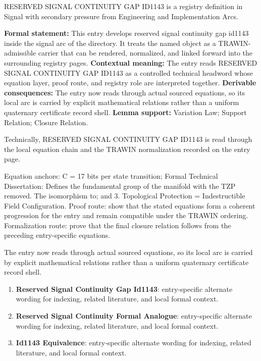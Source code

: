 
\begingroup\small
{}
RESERVED SIGNAL CONTINUITY GAP ID1143 is a registry definition in Signal with secondary pressure from Engineering and Implementation Arcs.

\begingroup\footnotesize\setlength{\emergencystretch}{3em}\sloppy
\textbf{Formal statement:} This entry develops reserved signal continuity gap id1143 inside the signal arc of the directory. It treats the named object as a TRAWIN-admissible carrier that can be rendered, normalized, and linked forward into the surrounding registry pages. \textbf{Contextual meaning:} The entry reads RESERVED SIGNAL CONTINUITY GAP ID1143 as a controlled technical headword whose equation layer, proof route, and registry role are interpreted together. \textbf{Derivable consequences:} The entry now reads through actual sourced equations, so its local arc is carried by explicit mathematical relations rather than a uniform quaternary certificate record shell. \textbf{Lemma support:} Variation Law; Support Relation; Closure Relation.\par
\endgroup

Technically, RESERVED SIGNAL CONTINUITY GAP ID1143 is read through the local equation chain and the TRAWIN normalization recorded on the entry page.

Equation anchors: C = 17 bits per state transition; Formal Technical Dissertation: Defines the fundamental group of the manifold with the TZP removed. The isomorphism to; and 3. Topological Protection = Indestructible Field Configuration. Proof route: show that the stated equations form a coherent progression for the entry and remain compatible under the TRAWIN ordering. Formalization route: prove that the final closure relation follows from the preceding entry-specific equations.

The entry now reads through actual sourced equations, so its local arc is carried by explicit mathematical relations rather than a uniform quaternary certificate record shell.
\endgroup

\begin{enumerate}[leftmargin=1.6em,itemsep=6pt,topsep=4pt]
\item \textbf{Reserved Signal Continuity Gap Id1143}: entry-specific alternate wording for indexing, related literature, and local formal context.
\item \textbf{Reserved Signal Continuity Formal Analogue}: entry-specific alternate wording for indexing, related literature, and local formal context.
\item \textbf{Id1143 Equivalence}: entry-specific alternate wording for indexing, related literature, and local formal context.
\end{enumerate}

